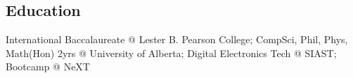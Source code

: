 \documentclass[line,margin,hidelinks]{res}
\begin{document}
\begin{resume}


\section{Education}
\begin{par}
International Baccalaureate @ Lester B. Pearson College; CompSci, Phil, Phys, Math(Hon) 2yrs @ University of Alberta; Digital Electronics Tech @ SIAST; Bootcamp @ NeXT
\end{par}

\end{resume}
\end{document}
